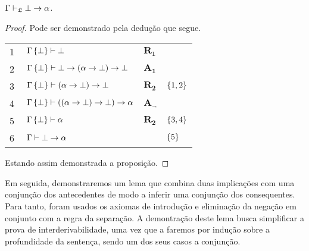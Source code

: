 \begin{tcolorbox}[enhanced jigsaw, breakable, sharp corners, colframe=black, colback=white, boxrule=0.5pt, left=1.5mm, right=1.5mm, top=1.5mm, bottom=1.5mm]
\begin{lemma}[Explosão]\label{explosion}
    $\Gamma\mathrel{\vdash}_\mathfrak{L}\bot\to\alpha$.
    \begin{proof}
        Pode ser demonstrado pela dedução que segue.

        \vspace{0.5\baselineskip}
        \footnotesize
        \setlength{\rowskip}{0.5\baselineskip}
        \begin{xltabular}{\textwidth}{r | X l l}
            \scriptsize{\phantom{0}1}\phantom{ } & $\ \Gamma\set{\bot}\entails\bot$                              & $\hyperref[modal.rule.1]{\mathbf{R_1}}$\phantom{1} & \\[\rowskip]
            \scriptsize{\phantom{0}2}\phantom{ } & $\ \Gamma\set{\bot}\entails\bot\to(\alpha\to\bot)\to\bot$     & $\hyperref[modal.axiom.1]{\mathbf{A_1}}$           & \\[\rowskip]
            \scriptsize{\phantom{0}3}\phantom{ } & $\ \Gamma\set{\bot}\entails(\alpha\to\bot)\to\bot$            & $\hyperref[modal.rule.2]{\mathbf{R_2}}$            & $\left\{1,2\right\}$\\[\rowskip]
            \scriptsize{\phantom{0}4}\phantom{ } & $\ \Gamma\set{\bot}\entails((\alpha\to\bot)\to\bot)\to\alpha$ & $\hyperref[modal.axiom.negation]{\mathbf{A_\neg}}$ & \\[\rowskip]
            \scriptsize{\phantom{0}5}\phantom{ } & $\ \Gamma\set{\bot}\entails\alpha$                            & $\hyperref[modal.rule.2]{\mathbf{R_2}}$            & $\left\{3,4\right\}$\\[\rowskip]
            \scriptsize{\phantom{0}6}\phantom{ } & $\ \Gamma\entails\bot\to\alpha$                               &                                & $\left\{5\right\}$\\[\rowskip]
        \end{xltabular}
        \normalsize

        \vspace{0.5\baselineskip}
        Estando assim demonstrada a proposição.
    \end{proof}
\end{lemma}
\end{tcolorbox}

\vspace{.5\baselineskip}
Em seguida, demonstraremos um lema que combina duas implicações com uma conjunção dos antecedentes de modo a inferir uma conjunção dos consequentes.
Para tanto, foram usados os axiomas de introdução e eliminação da negação em conjunto com a regra da separação.
A demontração deste lema busca simplificar a prova de interderivabilidade, uma vez que a faremos por indução sobre a profundidade da sentença, sendo um dos seus casos a conjunção.

